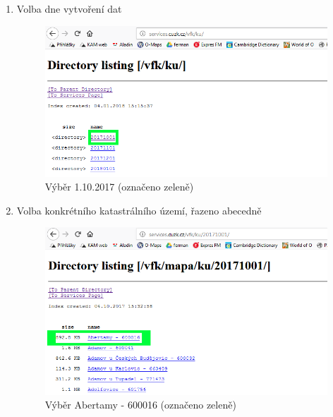 \begin{enumerate}
  \newpage
  \item{Volba dne vytvoření dat}
  \begin{figure}[H]
	 \centering
      \includegraphics[width=15cm]{./pictures/stazeni_dat_3kr.png}
      \caption{Výběr 1.10.2017 (označeno zeleně)}
      \label{fig:3kr_stazeni}
  \end{figure}
  
  \item{Volba konkrétního katastrálního území, řazeno abecedně}
  \begin{figure}[H]
	 \centering
      \includegraphics[width=15cm]{./pictures/stazeni_dat_4kr.png}
      \caption{Výběr Abertamy - 600016 (označeno zeleně)}
      \label{fig:4kr_stazeni}
  \end{figure}
  

\end{enumerate}
